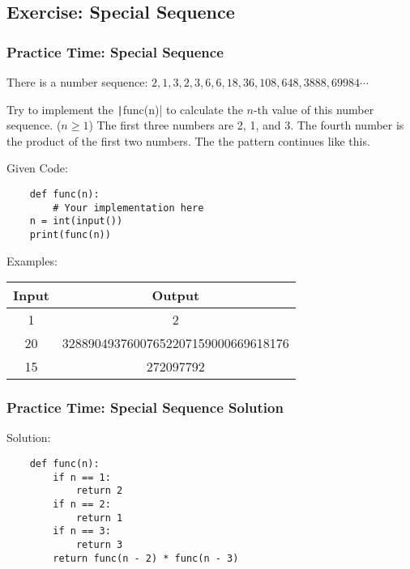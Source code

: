 \documentclass{beamer}
\newcommand{\python}[1]{\texttt|#1|}
\begin{document}
\subsection{Exercise: Special Sequence}
\begin{frame}[fragile]
    \frametitle{Practice Time: Special Sequence}

    There is a number sequence:
    $2, 1, 3, 2, 3, 6, 6, 18, 36, 108, 648, 3888, 69984 \cdots$

    Try to implement the \python{func(n)} to calculate
    the $n$-th value of this number sequence. ($n \ge 1$)
    The first three numbers are 2, 1, and 3.
    The fourth number is the product of the first two numbers.
    The the pattern continues like this.

    Given Code:
    \begin{verbatim}
    def func(n):
        # Your implementation here
    n = int(input())
    print(func(n))
    \end{verbatim}

    Examples:

    \begin{center}
        \small
        \begin{tabular}{|c|c|}
            \hline
            Input & Output                              \\ \hline
            1     & 2                                   \\ \hline
            20    & 32889049376007652207159000669618176 \\ \hline
            15    & 272097792                           \\ \hline
        \end{tabular}
    \end{center}
\end{frame}

\begin{frame}[fragile]
    \frametitle{Practice Time: Special Sequence Solution}

    Solution:
    \begin{verbatim}
    def func(n):
        if n == 1:
            return 2
        if n == 2:
            return 1
        if n == 3:
            return 3
        return func(n - 2) * func(n - 3)
    \end{verbatim}
\end{frame}
\end{document}
